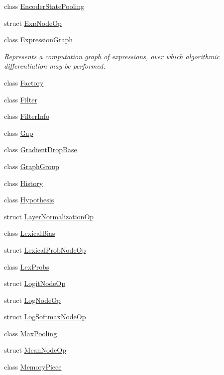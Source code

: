 \begin{DoxyCompactItemize}
\item 
class \hyperlink{classmarian_1_1EncoderStatePooling}{Encoder\+State\+Pooling}
\item 
struct \hyperlink{structmarian_1_1ExpNodeOp}{Exp\+Node\+Op}
\item 
class \hyperlink{classmarian_1_1ExpressionGraph}{Expression\+Graph}
\begin{DoxyCompactList}\small\item\em Represents a computation graph of expressions, over which algorithmic differentiation may be performed. \end{DoxyCompactList}\item 
class \hyperlink{classmarian_1_1Factory}{Factory}
\item 
class \hyperlink{classmarian_1_1Filter}{Filter}
\item 
class \hyperlink{classmarian_1_1FilterInfo}{Filter\+Info}
\item 
class \hyperlink{classmarian_1_1Gap}{Gap}
\item 
class \hyperlink{classmarian_1_1GradientDropBase}{Gradient\+Drop\+Base}
\item 
class \hyperlink{classmarian_1_1GraphGroup}{Graph\+Group}
\item 
class \hyperlink{classmarian_1_1History}{History}
\item 
class \hyperlink{classmarian_1_1Hypothesis}{Hypothesis}
\item 
struct \hyperlink{structmarian_1_1LayerNormalizationOp}{Layer\+Normalization\+Op}
\item 
class \hyperlink{classmarian_1_1LexicalBias}{Lexical\+Bias}
\item 
struct \hyperlink{structmarian_1_1LexicalProbNodeOp}{Lexical\+Prob\+Node\+Op}
\item 
class \hyperlink{classmarian_1_1LexProbs}{Lex\+Probs}
\item 
struct \hyperlink{structmarian_1_1LogitNodeOp}{Logit\+Node\+Op}
\item 
struct \hyperlink{structmarian_1_1LogNodeOp}{Log\+Node\+Op}
\item 
struct \hyperlink{structmarian_1_1LogSoftmaxNodeOp}{Log\+Softmax\+Node\+Op}
\item 
class \hyperlink{classmarian_1_1MaxPooling}{Max\+Pooling}
\item 
struct \hyperlink{structmarian_1_1MeanNodeOp}{Mean\+Node\+Op}
\item 
class \hyperlink{classmarian_1_1MemoryPiece}{Memory\+Piece}
\item 

\end{DoxyCompactItemize}
